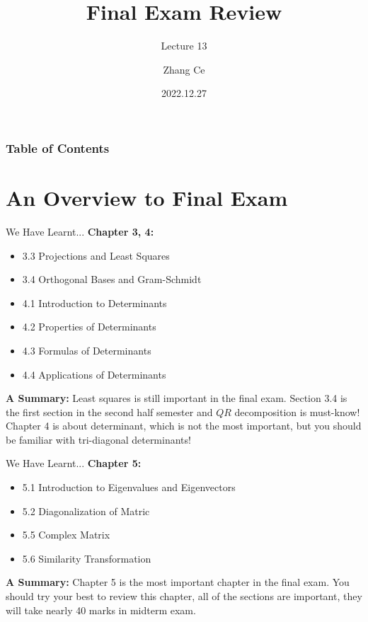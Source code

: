 \documentclass{beamer}
\title[Linear Algebra] %
{Final Exam Review}
\subtitle{Lecture 13}
\author[zhangc2019@mail.sustech.edu.cn] %
{
    Zhang Ce
}
\institute[] %
{
    Department of Electrical and Electronic Engineering\\
    Southern University of Science and Technology
}
\date[2022.12.27] %
{2022.12.27}
\begin{document}
\frame{\titlepage}


\begin{frame}
\frametitle{Table of Contents}
\tableofcontents
\end{frame}
\section{An Overview to Final Exam}
\begin{frame}{We Have Learnt...}
\textbf{Chapter 3, 4:}
\begin{itemize}
    \item 3.3 Projections and Least Squares
    \item 3.4 Orthogonal Bases and Gram-Schmidt
    \item 4.1 Introduction to Determinants
    \item 4.2 Properties of Determinants
    \item 4.3 Formulas of Determinants
    \item 4.4 Applications of Determinants
\end{itemize}

\vspace{5pt}
\textbf{A Summary:} Least squares is still important in the final exam. Section 3.4 is the first section in the second half semester and $QR$ decomposition is must-know! Chapter 4 is about determinant, which is not the most important, but you should be familiar with tri-diagonal determinants!
\end{frame}

\begin{frame}{We Have Learnt...}
\textbf{Chapter 5:}
\begin{itemize}
    \item 5.1 Introduction to Eigenvalues and Eigenvectors
    \item 5.2 Diagonalization of Matric
    \item 5.5 Complex Matrix
    \item 5.6 Similarity Transformation
\end{itemize}

\vspace{5pt}
\textbf{A Summary:} Chapter 5 is the most important chapter in the final exam. You should try your best to review this chapter, all of the sections are important, they will take nearly 40 marks in midterm exam.
\end{frame}
\end{document}
